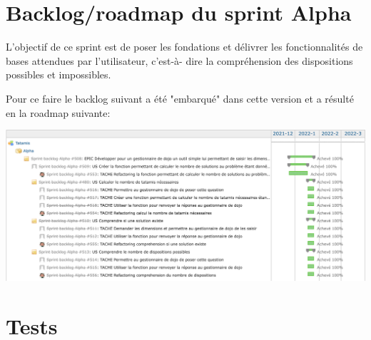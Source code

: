 \section{Backlog/roadmap du sprint Alpha}

L’objectif de ce sprint est de poser les fondations et délivrer les fonctionnalités de bases attendues par l’utilisateur,
c'est-à- dire la compréhension des dispositions possibles et impossibles.

Pour ce faire le backlog suivant a été "embarqué" dans cette version et a résulté en la roadmap suivante:

\begin{center}
    \includegraphics[width=16cm]{images/tatamis-gantt-alpha.png}
\end{center}

\section{Tests}


